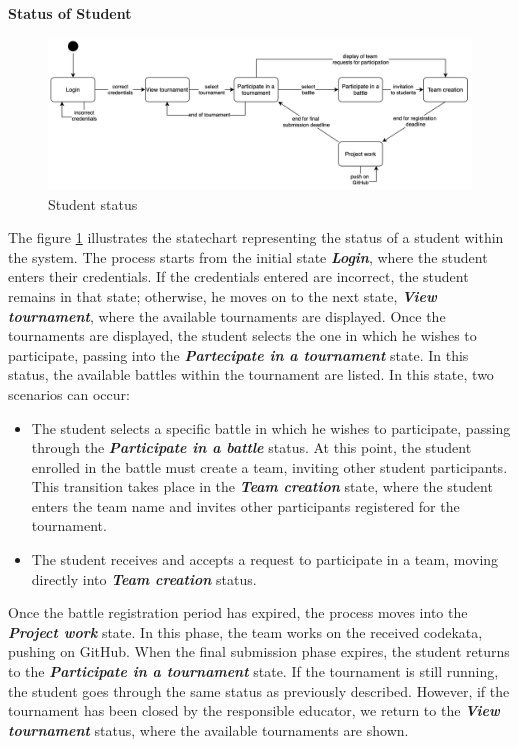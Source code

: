 \vspace{1.5\baselineskip}
\newpage
\textbf{Status of Student}

\begin{figure}[h]
    \centering
    \includegraphics[scale=0.4]{images/Statecharts/StudentStatus.png} 
    \caption{Student status}
    \label{fig_StudentStatus}
\end{figure}

The figure \ref{fig_StudentStatus} illustrates the statechart representing the status of a student within the system.
\newline
The process starts from the initial state \textbf{\textit{Login}}, where the student enters their credentials. If the credentials entered are incorrect, the student remains in that state; otherwise, he moves on to the next state, \textbf{\textit{View tournament}}, where the available tournaments are displayed.
\newline
Once the tournaments are displayed, the student selects the one in which he wishes to participate, passing into the \textbf{\textit{Partecipate in a tournament}} state. In this status, the available battles within the tournament are listed.
In this state, two scenarios can occur:
\begin{itemize}
\item The student selects a specific battle in which he wishes to participate, passing through the \textbf{\textit{Participate in a battle}} status. At this point, the student enrolled in the battle must create a team, inviting other student participants. This transition takes place in the \textbf{\textit{Team creation}} state, where the student enters the team name and invites other participants registered for the tournament.
\item The student receives and accepts a request to participate in a team, moving directly into \textbf{\textit{Team creation}} status.
\end{itemize}

Once the battle registration period has expired, the process moves into the \textbf{\textit{Project work}} state. In this phase, the team works on the received codekata, pushing on GitHub.
\newline
When the final submission phase expires, the student returns to the \textbf{\textit{Participate in a tournament}} state. If the tournament is still running, the student goes through the same status as previously described. However, if the tournament has been closed by the responsible educator, we return to the \textbf{\textit{View tournament}} status, where the available tournaments are shown.






